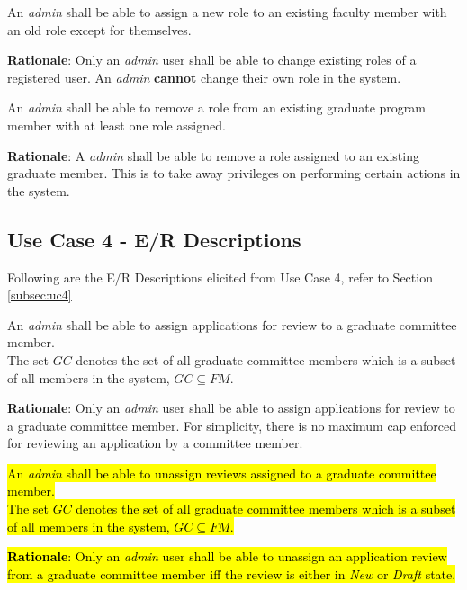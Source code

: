 \documentclass[fontsize=12pt,paper=letter,twoside]{scrartcl}
\begin{document}
\genreq
{An \emph{admin} shall be able to assign a new role to an existing faculty member with an old role except for themselves.\\}
{}
\label{R10}

\smallskip
\noindent \textbf{Rationale}: Only an \emph{admin} user shall be able to change existing roles of a registered user. An \emph{admin} \textbf{cannot} change their own role in the system.

\genreq
{An \emph{admin} shall be able to remove a role from an existing graduate program member with at least one role assigned.\\}
{}
\label{R11}

\smallskip
\noindent \textbf{Rationale}: A \emph{admin} shall be able to remove a role assigned to an existing graduate member. This is to take away privileges on performing certain actions in the system. 

\subsection{Use Case 4 - E/R Descriptions}

Following are the E/R Descriptions elicited from Use Case 4, refer to Section \ref{subsec:uc4}


\rdescription
{An \emph{admin} shall be able to assign applications for review to a graduate committee member.\\}
{The set $GC$ denotes the set of all graduate committee members which is a subset of all members in the system, $GC \subseteq FM$.}
\label{R12}

\smallskip
\noindent \textbf{Rationale}: Only an \emph{admin} user shall be able to assign applications for review to a graduate committee member. For simplicity, there is no maximum cap enforced for reviewing an application by a committee member.

\rdescription
{\hl{An \emph{admin} shall be able to unassign reviews assigned to a graduate committee member.\\}}
{\hl{The set $GC$ denotes the set of all graduate committee members which is a subset of all members in the system, $GC \subseteq FM$.}}

\smallskip
\noindent \hl{\textbf{Rationale}: Only an \emph{admin} user shall be able to unassign an application review from a graduate committee member iff the review is either in \emph{New} or \emph{Draft} state.}
\end{document}
